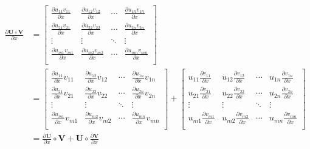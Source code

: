 \documentclass{ctexart}
\theoremstyle{definition}
\def \Uv {\mathbf{U}}
\def \Vv {\mathbf{V}}
\begin{document}
\begin{align*}
    \frac{\partial \Uv \circ \Vv}{\partial x} & = \begin{bmatrix}
        \frac{\partial u_{11} v_{11}}{\partial x} & \frac{\partial u_{12} v_{12}}{\partial x} & \cdots & \frac{\partial u_{1n} v_{1n}}{\partial x} \\
        \frac{\partial u_{21} v_{21}}{\partial x} & \frac{\partial u_{22} v_{22}}{\partial x} & \cdots & \frac{\partial u_{2n} v_{2n}}{\partial x} \\
        \vdots                                    & \vdots                                    & \ddots & \vdots                                    \\
        \frac{\partial u_{m1} v_{m1}}{\partial x} & \frac{\partial u_{m2} v_{m2}}{\partial x} & \cdots & \frac{\partial u_{mn} v_{mn}}{\partial x} \\
    \end{bmatrix}                                                            \\
                                              & = \begin{bmatrix}
        \frac{\partial u_{11}}{\partial x} v_{11} & \frac{\partial u_{12}}{\partial x} v_{12} & \cdots & \frac{\partial u_{1n}}{\partial x} v_{1n} \\
        \frac{\partial u_{21}}{\partial x} v_{21} & \frac{\partial u_{22}}{\partial x} v_{22} & \cdots & \frac{\partial u_{2n}}{\partial x} v_{2n} \\
        \vdots                                    & \vdots                                    & \ddots & \vdots                                    \\
        \frac{\partial u_{m1}}{\partial x} v_{m1} & \frac{\partial u_{m2}}{\partial x} v_{m2} & \cdots & \frac{\partial u_{mn}}{\partial x} v_{mn} \\
    \end{bmatrix} + \begin{bmatrix}
        u_{11} \frac{\partial v_{11}}{\partial x} & u_{12} \frac{\partial v_{12}}{\partial x} & \cdots & u_{1n} \frac{\partial v_{1n}}{\partial x} \\
        u_{21} \frac{\partial v_{21}}{\partial x} & u_{22} \frac{\partial v_{22}}{\partial x} & \cdots & u_{2n} \frac{\partial v_{2n}}{\partial x} \\
        \vdots                                    & \vdots                                    & \ddots & \vdots                                    \\
        u_{m1} \frac{\partial v_{m1}}{\partial x} & u_{m2} \frac{\partial v_{m2}}{\partial x} & \cdots & u_{mn} \frac{\partial v_{mn}}{\partial x} \\
    \end{bmatrix}                               \\
                                              & = \frac{\partial \Uv}{\partial x} \circ \Vv + \Uv \circ \frac{\partial \Vv}{\partial x}
\end{align*}
\end{document}
